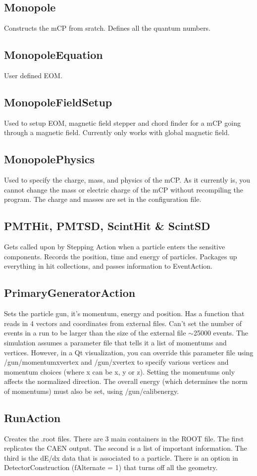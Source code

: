 \documentclass[prd,noshowpacs,nofootinbib,amsmath,amssymb,superscriptaddress]{revtex4}
\begin{document}
\subsection{Monopole}
Constructs the mCP from sratch. Defines all the quantum numbers.
\subsection{MonopoleEquation}
User defined EOM.
\subsection{MonopoleFieldSetup}
Used to setup EOM, magnetic field stepper and chord finder for a mCP going through a magnetic field. 
Currently only works with global magnetic field.
\subsection{MonopolePhysics}
Used to specify the charge, mass, and physics of the mCP. As it currently is, you cannot change the mass or electric charge of the mCP without recompiling the program.  
The charge and masses are set in the configuration file.
\subsection{PMTHit, PMTSD, ScintHit \& ScintSD}
Gets called upon by Stepping Action when a particle enters the sensitive components. Records the position, time and energy of particles.
Packages up everything in hit collections, and passes information to EventAction.
\subsection{PrimaryGeneratorAction}
Sets the particle gun, it's momentum, energy and position. Has a function that reads in 4 vectors and coordinates from external files.
Can't set the number of events in a run to be larger than the size of the external file $\sim$25000 events. The simulation assumes a parameter file that tells it a list of momentums and vertices. However, in a Qt visualization, you can override this parameter file using /gun/momentumxvertex and /gun/xvertex to specify various vertices and momentum choices (where x can be x, y or z). Setting the momentums only affects the normalized direction. The overall energy (which determines the norm of momentums) must also be set, using /gun/calibenergy. 
\subsection{RunAction}
Creates the .root files. There are 3 main containers in the ROOT file. The first replicates the CAEN output. The second is a list of important information. The third is the dE/dx data that is associated to a particle. 
There is an option in DetectorConstruction (fAlternate = 1) that turns off all the geometry.
\end{document}
